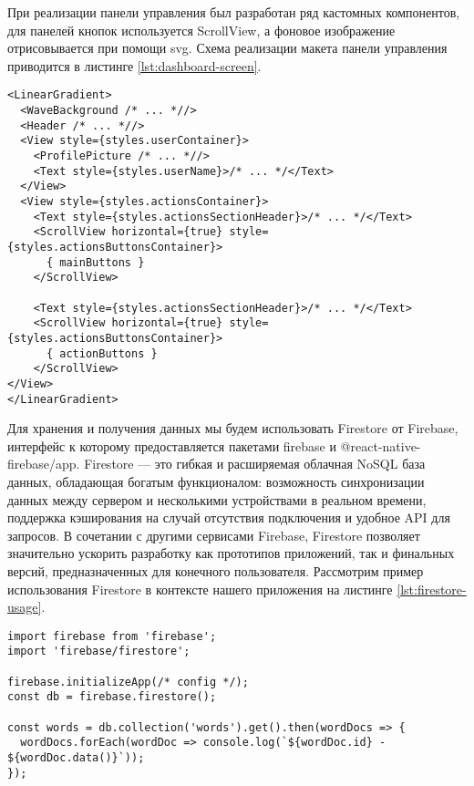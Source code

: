 При реализации панели управления был разработан ряд кастомных компонентов, для панелей кнопок используется ScrollView, а фоновое изображение отрисовывается при помощи svg. Схема реализации макета панели управления приводится в листинге \ref{lst:dashboard-screen}.
\begin{lstlisting}[basicstyle=\fontsize{11}{11}\selectfont,tabsize=4,breaklines=true,caption={Структура страницы панели управления.},captionpos=b,label={lst:dashboard-screen}]
<LinearGradient>
  <WaveBackground /* ... *//>
  <Header /* ... *//>
  <View style={styles.userContainer}>
    <ProfilePicture /* ... *//>
    <Text style={styles.userName}>/* ... */</Text>
  </View>
  <View style={styles.actionsContainer}>
    <Text style={styles.actionsSectionHeader}>/* ... */</Text>
    <ScrollView horizontal={true} style={styles.actionsButtonsContainer}>
      { mainButtons }
    </ScrollView>

    <Text style={styles.actionsSectionHeader}>/* ... */</Text>
    <ScrollView horizontal={true} style={styles.actionsButtonsContainer}>
      { actionButtons }
    </ScrollView>
</View>
</LinearGradient>
\end{lstlisting}

Для хранения и получения данных мы будем использовать Firestore от Firebase, интерфейс к которому предоставляется пакетами firebase и @react-native-firebase/app. Firestore --- это гибкая и расширяемая облачная NoSQL база данных, обладающая богатым функционалом: возможность синхронизации данных между сервером и несколькими устройствами в реальном времени, поддержка кэширования на случай отсутствия подключения и удобное API для запросов. В сочетании с другими сервисами Firebase, Firestore позволяет значительно ускорить разработку как прототипов приложений, так и финальных версий, предназначенных для конечного пользователя. Рассмотрим пример использования Firestore в контексте нашего приложения на листинге \ref{lst:firestore-usage}.

\begin{lstlisting}[basicstyle=\fontsize{11}{11}\selectfont,tabsize=4,breaklines=true,caption={Использования Firestore для получения данных карточек главной ленты.},captionpos=b,label={lst:firestore-usage}]
import firebase from 'firebase';
import 'firebase/firestore';

firebase.initializeApp(/* config */);
const db = firebase.firestore();

const words = db.collection('words').get().then(wordDocs => {
  wordDocs.forEach(wordDoc => console.log(`${wordDoc.id} - ${wordDoc.data()}`));
});

\end{lstlisting}


